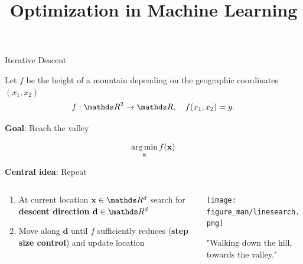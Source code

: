 \documentclass[11pt,compress,t,notes=noshow, xcolor=table]{beamer}
\title{Optimization in Machine Learning}
\begin{document}


\begin{vbframe}{Iterative Descent}

	Let $f$ be the height of a mountain depending on the geographic coordinates $(x_1, x_2)$
	\vspace*{-0.1cm}
	$$
	f: \R^2 \to \R, \quad f(x_1, x_2) = y.
	$$
	
	\textbf{Goal}: Reach the valley

	$$
	\operatorname*{arg\,min}_{\mathbf{x}} f(\mathbf{x})
	$$
	
	\textbf{Central idea}: Repeat
	\vspace*{-0.15cm}
	\begin{columns}
		\begin{column}{0.58\textwidth}
			\begin{enumerate}
				\item At current location $\xv \in \R^d$ search for \textbf{descent direction} $\mathbf{d} \in \R^d$ 
			  	\item Move along $\mathbf{d}$ until $f$ \glqq sufficiently\grqq{} reduces (\textbf{step size control}) and update location
			\end{enumerate}
		\end{column}
		\begin{column}{0.4\textwidth}
			\begin{center}
			\texttt{[image: figure\_man/linesearch.png]}
			\hspace{2cm} \begin{footnotesize} "Walking down the hill, towards the valley." \end{footnotesize}\\
			\end{center}
		\end{column}
	\end{columns}
	
\end{vbframe}
\end{document}
